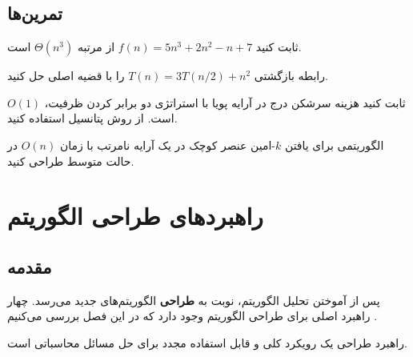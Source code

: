 \documentclass{matinbook}
\begin{document}
    \section{تمرین‌ها}
    
    \begin{exercise}
        ثابت کنید $f(n) = 5n^{3} + 2n^{2} - n + 7$
        از مرتبه $\Theta(n^{3})$ است.
        \label{exc:theta-cubic}
    \end{exercise}
    
    \begin{exercise}
        رابطه بازگشتی $T(n) = 3T(n/2) + n^{2}$ را
        با قضیه اصلی حل کنید.
        \label{exc:master-theorem}
    \end{exercise}
    
    \begin{exercise}
        ثابت کنید هزینه سرشکن درج در آرایه پویا
        با استراتژی دو برابر کردن ظرفیت، $O(1)$ است.
        از روش پتانسیل استفاده کنید.
        \label{exc:dynamic-array-amortized}
    \end{exercise}
    
    \begin{exercise}
        الگوریتمی برای یافتن $k$-امین عنصر کوچک
        در یک آرایه نامرتب با زمان $O(n)$
        در حالت متوسط طراحی کنید.
        \label{exc:kth-smallest}
    \end{exercise}
    
    
    
    \chapter{راهبردهای طراحی الگوریتم}
    \label{chap:design-paradigms}
    
    \section{مقدمه}
    
    پس از آموختن تحلیل الگوریتم، نوبت به \textbf{طراحی}
    الگوریتم‌های جدید می‌رسد. چهار راهبرد اصلی
    برای طراحی الگوریتم وجود دارد که در این فصل
    بررسی می‌کنیم \cite{cormen2009}.
    
    \begin{definition}
        راهبرد طراحی
        یک رویکرد کلی و قابل استفاده مجدد
        برای حل مسائل محاسباتی است.
        \label{def:paradigm}
    \end{definition}
    
\end{document}
